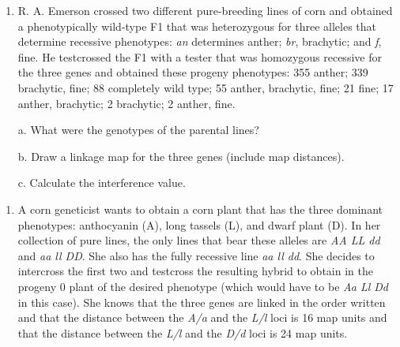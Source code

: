 \documentclass[11pt,]{article}
\providecommand{\tightlist}{%
  \setlength{\itemsep}{0pt}\setlength{\parskip}{0pt}}
\begin{document}
\begin{blackbox}

\begin{enumerate}
\def\labelenumi{\arabic{enumi}.}
\setcounter{enumi}{22}
\tightlist
\item
  R. A. Emerson crossed two different pure-breeding lines of corn and
  obtained a phenotypically wild-type F1 that was heterozygous for three
  alleles that determine recessive phenotypes: \emph{an} determines
  anther; \emph{br}, brachytic; and \emph{f}, fine. He testcrossed the
  F1 with a tester that was homozygous recessive for the three genes and
  obtained these progeny phenotypes: 355 anther; 339 brachytic, fine; 88
  completely wild type; 55 anther, brachytic, fine; 21 fine; 17 anther,
  brachytic; 2 brachytic; 2 anther, fine.
\end{enumerate}

\begin{enumerate} 
 \item[a.]{ What were the genotypes of the parental lines? } 
 \item[b.]{ Draw a linkage map for the three genes (include map distances). } 
 \item[c.]{ Calculate the interference value. } 
 \end{enumerate}

\vspace{15cm}

\end{blackbox}

\begin{blackbox}

\begin{enumerate}
\def\labelenumi{\arabic{enumi}.}
\setcounter{enumi}{44}
\tightlist
\item
  A corn geneticist wants to obtain a corn plant that has the three
  dominant phenotypes: anthocyanin (A), long tassels (L), and dwarf
  plant (D). In her collection of pure lines, the only lines that bear
  these alleles are \emph{AA LL dd} and \emph{aa ll DD}. She also has
  the fully recessive line \emph{aa ll dd}. She decides to intercross
  the first two and testcross the resulting hybrid to obtain in the
  progeny 0 plant of the desired phenotype (which would have to be
  \emph{Aa Ll Dd} in this case). She knows that the three genes are
  linked in the order written and that the distance between the
  \emph{A/a} and the \emph{L/l} loci is 16 map units and that the
  distance between the \emph{L/l} and the \emph{D/d} loci is 24 map
  units.
\end{enumerate}

\vspace{17cm}

\end{blackbox}
\end{document}
